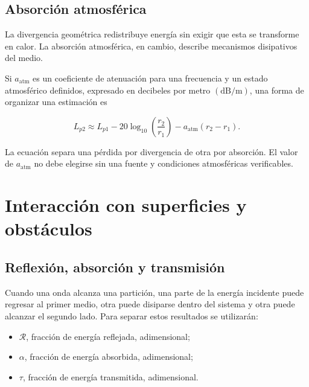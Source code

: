 \subsection{Absorción atmosférica}
\label{sec:u9-absorcion-atmosferica}

La divergencia geométrica redistribuye energía sin exigir que esta se
transforme en calor. La absorción atmosférica, en cambio, describe mecanismos
disipativos del medio.

 Si
\(a_\mathrm{atm}\) es un coeficiente de atenuación para una frecuencia y un
estado atmosférico definidos, expresado en decibeles por metro
\((\text{dB}/\text{m})\), una forma de organizar una estimación es

\begin{equation}
    L_{p2}
      \approx L_{p1}
      -20\log_{10}\!\left(\frac{r_2}{r_1}\right)
      -a_\mathrm{atm}(r_2-r_1).
    \label{eq:u9-distancia-absorcion-atmosferica}
\end{equation}

La ecuación separa una pérdida por divergencia de otra por absorción. El valor
de \(a_\mathrm{atm}\) no debe elegirse sin una fuente y condiciones
atmosféricas verificables.

\section{Interacción con superficies y obstáculos}
\label{sec:u9-superficies}

\subsection{Reflexión, absorción y transmisión}
\label{sec:u9-reflexion-absorcion-transmision}

Cuando una onda alcanza una partición, una parte de la energía incidente puede
regresar al primer medio, otra puede disiparse dentro del sistema y otra puede
alcanzar el segundo lado. Para separar estos resultados se utilizarán:

\begin{itemize}
    \item \(\mathcal{R}\), fracción de energía reflejada, adimensional;
    \item \(\alpha\), fracción de energía absorbida, adimensional;
    \item \(\tau\), fracción de energía transmitida, adimensional.
\end{itemize}

